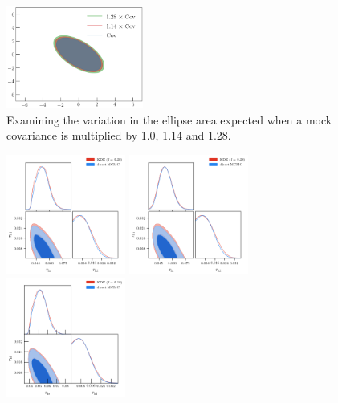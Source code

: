 \documentclass[prd,amsmath,amssymb,floatfix,superscriptaddress,nofootinbib]{revtex4-1}
\begin{document}
\begin{figure}
\includegraphics[width=0.4\textwidth]{cosmomc_kde/plot_ellipse.png}
\caption{Examining the variation in the ellipse area expected when a mock covariance is multiplied by 1.0, 1.14 and 1.28.
}
\label{fig:}
\end{figure}


\begin{figure}
%
\includegraphics[width=0.35\textwidth]{cosmomc_kde/pl18_tanh_highz_test5_run1_vs_relike_tanh_highz_test9_run1_f0p28_taulo_prior_0p03_zre_prior_6p1_taulo_prior_0p0_tri.png}
\includegraphics[width=0.35\textwidth]{results/cosmomc_kde/pl18_tanh_highz_test5_run1_vs_relike_tanh_highz_test9_run1_f0p28_taulo_prior_0p03_zre_prior_6p1_taulo_prior_0p0_tri_smooth_scale_1D_2_num_bins_1D_20_smooth_scale_2D_2_num_bins_2D_25.png}
%
\includegraphics[width=0.35\textwidth]{cosmomc_kde/pl18_tanh_highz_test5_run1_vs_relike_tanh_highz_test9_run4_f0p18_taulo_prior_0p03_zre_prior_6p1_taulo_prior_0p0_tri.png}

\end{figure}
\end{document}
